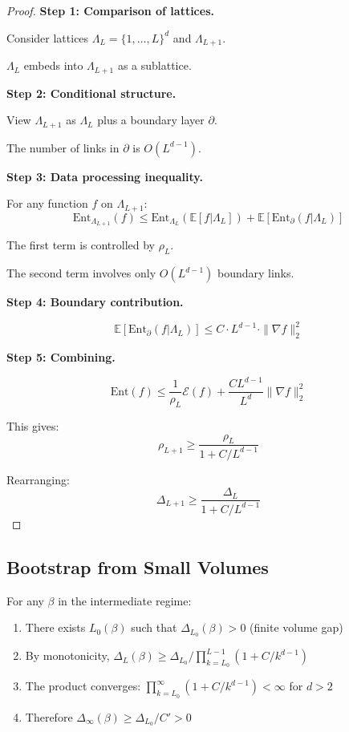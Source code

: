 \begin{proof}
\textbf{Step 1: Comparison of lattices.}

Consider lattices $\Lambda_L = \{1, \ldots, L\}^d$ and $\Lambda_{L+1}$.

$\Lambda_L$ embeds into $\Lambda_{L+1}$ as a sublattice.

\textbf{Step 2: Conditional structure.}

View $\Lambda_{L+1}$ as $\Lambda_L$ plus a boundary layer $\partial$.

The number of links in $\partial$ is $O(L^{d-1})$.

\textbf{Step 3: Data processing inequality.}

For any function $f$ on $\Lambda_{L+1}$:
\[
\mathrm{Ent}_{\Lambda_{L+1}}(f) \leq \mathrm{Ent}_{\Lambda_L}(\mathbb{E}[f | \Lambda_L]) + \mathbb{E}[\mathrm{Ent}_{\partial}(f | \Lambda_L)]
\]

The first term is controlled by $\rho_L$.

The second term involves only $O(L^{d-1})$ boundary links.

\textbf{Step 4: Boundary contribution.}

\[
\mathbb{E}[\mathrm{Ent}_{\partial}(f | \Lambda_L)] \leq C \cdot L^{d-1} \cdot \|\nabla f\|_2^2
\]

\textbf{Step 5: Combining.}

\[
\mathrm{Ent}(f) \leq \frac{1}{\rho_L} \mathcal{E}(f) + \frac{C L^{d-1}}{L^d} \|\nabla f\|_2^2
\]

This gives:
\[
\rho_{L+1} \geq \frac{\rho_L}{1 + C/L^{d-1}}
\]

Rearranging:
\[
\Delta_{L+1} \geq \frac{\Delta_L}{1 + C/L^{d-1}}
\]
\end{proof}

\subsection{Bootstrap from Small Volumes}

\begin{theorem}
\label{thm:bootstrap-finite}
For any $\beta$ in the intermediate regime:
\begin{enumerate}
\item There exists $L_0(\beta)$ such that $\Delta_{L_0}(\beta) > 0$ (finite volume gap)
\item By monotonicity, $\Delta_L(\beta) \geq \Delta_{L_0} / \prod_{k=L_0}^{L-1}(1 + C/k^{d-1})$
\item The product converges: $\prod_{k=L_0}^\infty (1 + C/k^{d-1}) < \infty$ for $d > 2$
\item Therefore $\Delta_\infty(\beta) \geq \Delta_{L_0} / C' > 0$
\end{enumerate}
\end{theorem}

